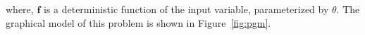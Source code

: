 \documentclass[10pt,journal,compsoc]{IEEEtran}
\newcommand{\alert}[1]{\textcolor{purple}{#1}}
\begin{document}
where, $\textbf{f}$ is a deterministic function of the input variable, parameterized by $\theta$. The graphical model of this problem is shown in Figure~\ref{fig:pgm}.

\end{document}
